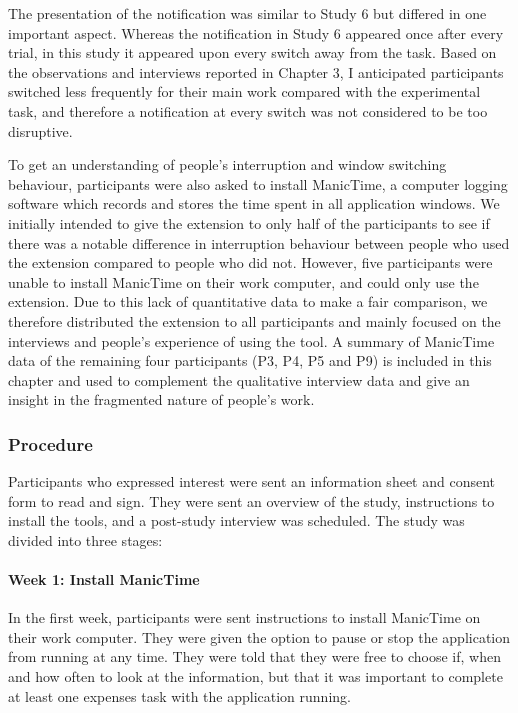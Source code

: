 The presentation of the notification was similar to Study 6 but differed in one important aspect. Whereas the notification in Study 6 appeared once after every trial, in this study it appeared upon every switch away from the task. Based on the observations and interviews reported in Chapter 3, I anticipated participants switched less frequently for their main work compared with the experimental task, and therefore a notification at every switch was not considered to be too disruptive.

To get an understanding of people’s interruption and window switching behaviour, participants were also asked to install ManicTime, a computer logging software which records and stores the time spent in all application windows. We initially intended to give the extension to only half of the participants to see if there was a notable difference in interruption behaviour between people who used the extension compared to people who did not. However, five participants were unable to install ManicTime on their work computer, and could only use the extension. Due to this lack of quantitative data to make a fair comparison, we therefore distributed the extension to all participants and mainly focused on the interviews and people’s experience of using the tool. A summary of ManicTime data of the remaining four participants (P3, P4, P5 and P9) is included in this chapter and used to complement the qualitative interview data and give an insight in the fragmented nature of people’s work.

\subsubsection{Procedure}
Participants who expressed interest were sent an information sheet and consent form to read and sign. They were sent an overview of the study, instructions to install the tools, and a post-study interview was scheduled.
The study was divided into three stages:

\paragraph{Week 1: Install ManicTime}
In the first week, participants were sent instructions to install ManicTime on their work computer. They were given the option to pause or stop the application from running at any time. They were told that they were free to choose if, when and how often to look at the information, but that it was important to complete at least one expenses task with the application running. 


